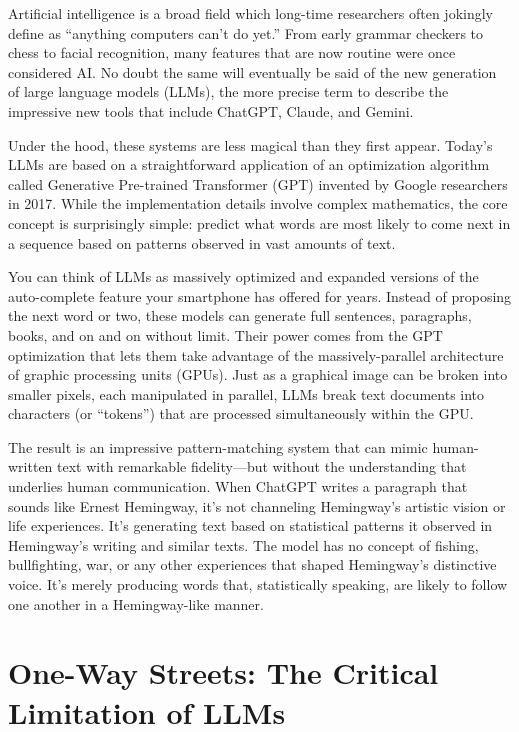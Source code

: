 \documentclass[
  Letterpaper,
]{scrbook}
\begin{document}
Artificial intelligence is a
broad field which long-time researchers often jokingly define as
``anything computers can't do yet.'' From early grammar checkers to
chess to facial recognition, many features that are now routine were
once considered AI. No doubt the same will eventually be said of the new
generation of large language
models (LLMs), the more precise
term to describe the impressive new tools that include
ChatGPT, Claude, and Gemini.

Under the hood, these systems are less magical than they first appear.
Today's LLMs are based on a straightforward application of an
optimization algorithm called Generative Pre-trained Transformer (GPT)
invented by Google researchers in 2017. While
the implementation details involve complex mathematics, the core concept
is surprisingly simple: predict what words are most likely to come next
in a sequence based on patterns observed in vast amounts of text.

You can think of LLMs as massively optimized and expanded versions of
the auto-complete feature your smartphone has offered for years. Instead
of proposing the next word or two, these models can generate full
sentences, paragraphs, books, and on and on without limit. Their power
comes from the GPT optimization that lets them take advantage of the
massively-parallel architecture of graphic processing units (GPUs). Just
as a graphical image can be broken into smaller pixels, each manipulated
in parallel, LLMs break text documents into characters (or ``tokens'')
that are processed simultaneously within the GPU.

The result is an impressive pattern-matching system that can mimic
human-written text with remarkable fidelity---but without the
understanding that underlies human communication. When ChatGPT writes a
paragraph that sounds like Ernest Hemingway, it's not channeling
Hemingway's artistic vision or life experiences. It's generating text
based on statistical patterns it observed in Hemingway's writing and
similar texts. The model has no concept of fishing, bullfighting, war,
or any other experiences that shaped Hemingway's distinctive voice. It's
merely producing words that, statistically speaking, are likely to
follow one another in a Hemingway-like manner.

\section{One-Way Streets: The Critical Limitation of
LLMs}\label{one-way-streets-the-critical-limitation-of-llms}
\end{document}
